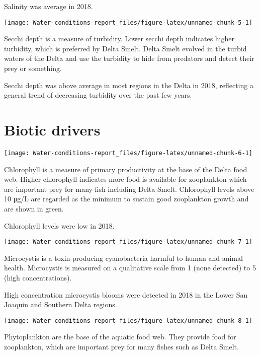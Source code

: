 \documentclass[]{article}
\begin{document}
Salinity was average in 2018.

\begin{center}\texttt{[image: Water-conditions-report\_files/figure-latex/unnamed-chunk-5-1]} \end{center}

Secchi depth is a measure of turbidity. Lower secchi depth indicates
higher turbidity, which is preferred by Delta Smelt. Delta Smelt evolved
in the turbid waters of the Delta and use the turbidity to hide from
predators and detect their prey or something.

Secchi depth was above average in most regions in the Delta in 2018,
reflecting a general trend of decreasing turbidity over the past few
years.

\hypertarget{biotic-drivers}{%
\section{Biotic drivers}\label{biotic-drivers}}

\begin{center}\texttt{[image: Water-conditions-report\_files/figure-latex/unnamed-chunk-6-1]} \end{center}

Chlorophyll is a measure of primary productivity at the base of the
Delta food web. Higher chlorophyll indicates more food is available for
zooplankton which are important prey for many fish including Delta
Smelt. Chlorophyll levels above 10 μg/L are regarded as the minimum to
sustain good zooplankton growth and are shown in green.

Chlorophyll levels were low in 2018.

\begin{center}\texttt{[image: Water-conditions-report\_files/figure-latex/unnamed-chunk-7-1]} \end{center}

Microcystis is a toxin-producing cyanobacteria harmful to human and
animal health. Microcystis is measured on a qualitative scale from 1
(none detected) to 5 (high concentrations).

High concentration microcystis blooms were detected in 2018 in the Lower
San Joaquin and Southern Delta regions.

\begin{center}\texttt{[image: Water-conditions-report\_files/figure-latex/unnamed-chunk-8-1]} \end{center}

Phytoplankton are the base of the aquatic food web. They provide food
for zooplankton, which are important prey for many fishes such as Delta
Smelt.
\end{document}
